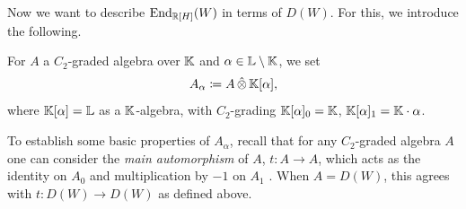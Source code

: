 Now we want to describe $\operatorname{End}_{{\mathbb R}[H]}(W)$ in terms of $D(W)$. For this, we introduce the following.

\begin{defn}
For $A$ a $C_2$-graded algebra over ${\mathbb K}$ and $\alpha \in {\mathbb L} \setminus {\mathbb K}$, we set
\[
A_{\alpha} \coloneqq A \, \hat{\otimes} \, {\mathbb K}[\alpha],
\]
where ${\mathbb K}[\alpha] = {\mathbb L}$ as a ${\mathbb K}$-algebra, with $C_2$-grading ${\mathbb K}[\alpha]_0 = {\mathbb K}$, ${\mathbb K}[\alpha]_1 = {\mathbb K} \cdot \alpha$.
\end{defn}

To establish some basic properties of $A_{\alpha}$, recall that for any $C_2$-graded algebra $A$ one can consider the \emph{main automorphism} of $A$, $t \colon A \rightarrow A$, which acts as the identity on $A_0$ and multiplication by $-1$ on $A_1$ \cite[Def.\ IV.3.7]{LAM}. When $A = D(W)$, this agrees with $t \colon D(W) \rightarrow D(W)$ as defined above.

